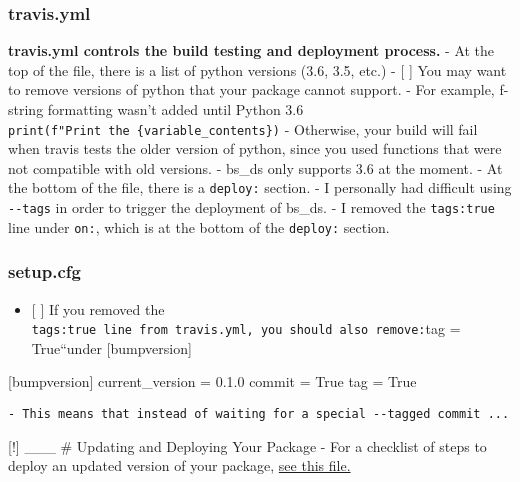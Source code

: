\documentclass[11pt]{article}
\providecommand{\tightlist}{%
      \setlength{\itemsep}{0pt}\setlength{\parskip}{0pt}}
\newenvironment{Shaded}{}{}
\newcommand{\DecValTok}[1]{\textcolor[rgb]{0.25,0.63,0.44}{{#1}}}
\newcommand{\FloatTok}[1]{\textcolor[rgb]{0.25,0.63,0.44}{{#1}}}
\newcommand{\NormalTok}[1]{{#1}}
\newcommand{\VariableTok}[1]{\textcolor[rgb]{0.10,0.09,0.49}{{#1}}}
\newcommand{\OperatorTok}[1]{\textcolor[rgb]{0.40,0.40,0.40}{{#1}}}
\begin{document}
\hypertarget{travis.yml}{%
\subsubsection{travis.yml}\label{travis.yml}}

\textbf{travis.yml controls the build testing and deployment process.} -
At the top of the file, there is a list of python versions (3.6, 3.5,
etc.) - {[} {]} You may want to remove versions of python that your
package cannot support. - For example, f-string formatting wasn't added
until Python 3.6
\texttt{print(f"Print\ the\ \{variable\_contents\}\textquotesingle{})} -
Otherwise, your build will fail when travis tests the older version of
python, since you used functions that were not compatible with old
versions. - bs\_ds only supports 3.6 at the moment. - At the bottom of
the file, there is a \texttt{deploy:} section. - I personally had
difficult using \texttt{-\/-tags} in order to trigger the deployment of
bs\_ds. - I removed the \texttt{tags:true} line under \texttt{on:},
which is at the bottom of the \texttt{deploy:} section.

\hypertarget{setup.cfg}{%
\subsubsection{setup.cfg}\label{setup.cfg}}

\begin{itemize}
\tightlist
\item
  {[} {]} If you removed the
  \texttt{tags:true\textasciigrave{}\textasciigrave{}\ line\ from\ travis.yml,\ you\ should\ also\ remove:}tag
  = True``under {[}bumpversion{]}
\end{itemize}

\begin{Shaded}
\begin{Highlighting}[]
\NormalTok{[bumpversion]}
\NormalTok{current_version }\OperatorTok{=} \DecValTok{0}\NormalTok{.}\FloatTok{1.0}
\NormalTok{commit }\OperatorTok{=} \VariableTok{True}
\NormalTok{tag }\OperatorTok{=} \VariableTok{True}
\end{Highlighting}
\end{Shaded}

\begin{verbatim}
- This means that instead of waiting for a special --tagged commit ...
\end{verbatim}

{[}!{]} \_\_\_ \# Updating and Deploying Your Package - For a checklist
of steps to deploy an updated version of your package,
\href{https://gist.github.com/audreyr/5990987}{see this file.}
\end{document}
